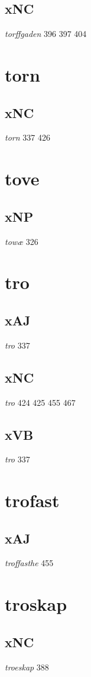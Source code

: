 \documentclass[a4paper,twocolumn]{article}
\begin{document}
\subsection{xNC}
\label{sec:org9be9ae0}
\emph{torffgaden} 396 397 404 
\section{torn}
\label{sec:org3cab88e}
\subsection{xNC}
\label{sec:org457269a}
\emph{torn} 337 426 
\section{tove}
\label{sec:org4374078}
\subsection{xNP}
\label{sec:orgfdbf119}
\emph{towæ} 326 
\section{tro}
\label{sec:org6777ce4}
\subsection{xAJ}
\label{sec:org969ae96}
\emph{tro} 337 
\subsection{xNC}
\label{sec:orgc6e513b}
\emph{tro} 424 425 455 467 
\subsection{xVB}
\label{sec:orgf6dce8a}
\emph{tro} 337 
\section{trofast}
\label{sec:org440c09b}
\subsection{xAJ}
\label{sec:org52ca520}
\emph{troffasthe} 455 
\section{troskap}
\label{sec:org136595e}
\subsection{xNC}
\label{sec:org1c22fc3}
\emph{troeskap} 388 
\end{document}
